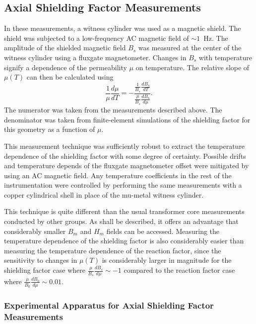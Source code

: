 
\subsection{Axial Shielding Factor Measurements\label{sec:axial}}


In these measurements, a witness cylinder was used as a magnetic
shield.  The shield was subjected to a low-frequency AC magnetic field
of $\sim 1$~Hz.  The amplitude of the shielded magnetic field $B_s$
was measured at the center of the witness cylinder using a fluxgate
magnetometer.  Changes in $B_s$ with temperature signify a dependence
of the permeability $\mu$ on temperature.  The relative slope of
$\mu(T)$ can then be calculated using
\begin{equation}
\frac{1}{\mu}\frac{d\mu}{dT}=-\frac{\frac{1}{B_s}\frac{dB_s}{dT}}{\frac{\mu}{B_s}\frac{dB_s}{d\mu}}.
\label{eqn:axial}
\end{equation}
The numerator was taken from the measurements described above. The
denominator was taken from finite-element simulations of the shielding
factor for this geometry as a function of $\mu$.

This measurement technique was sufficiently robust to extract the
temperature dependence of the shielding factor with some degree of
certainty.  Possible drifts and temperature depends of the fluxgate
magnetometer offset were mitigated by using an AC magnetic field.  Any
temperature coefficients in the rest of the instrumentation were
controlled by performing the same measurements with a copper
cylindrical shell in place of the mu-metal witness cylinder.

This technique is quite different than the usual transformer core
measurements conducted by other groups.  As shall be described, it
offers an advantage that considerably smaller $B_m$ and $H_m$ fields
can be accessed.  Measuring the temperature dependence of the
shielding factor is also considerably easier than measuring the
temperature dependence of the reaction factor, since the sensitivity
to changes in $\mu(T)$ is considerably larger in magnitude for the
shielding factor case where $\frac{\mu}{B_s}\frac{dB_s}{d\mu}\sim -1$
compared to the reaction factor case where
$\frac{\mu}{B_0}\frac{dB_0}{d\mu}\sim 0.01$.


\subsubsection{Experimental Apparatus for Axial Shielding Factor Measurements}

